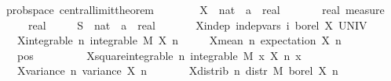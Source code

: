 \documentclass{article}
\begin{document}
\begin{isabellebody}
\isamarkupfalse%
\ {\isacharparenleft}\ prob{\isacharunderscore}space{\isacharparenright}\ central{\isacharunderscore}limit{\isacharunderscore}theorem{\isacharcolon}\isanewline
\ \ \ \isanewline
\ \ \ \ X\ {\isacharcolon}{\isacharcolon}\ {\isachardoublequoteopen}nat\ {\isasymRightarrow}\ {\isacharprime}a\ {\isasymRightarrow}\ real{\isachardoublequoteclose}\ \isanewline
\ \ \ \ {\isasymmu}\ {\isacharcolon}{\isacharcolon}\ {\isachardoublequoteopen}real\ measure{\isachardoublequoteclose}\ \isanewline
\ \ \ \ {\isasymsigma}\ {\isacharcolon}{\isacharcolon}\ real\ \isanewline
\ \ \ \ S\ {\isacharcolon}{\isacharcolon}\ {\isachardoublequoteopen}nat\ {\isasymRightarrow}\ {\isacharprime}a\ {\isasymRightarrow}\ real{\isachardoublequoteclose}\isanewline
\ \ \isanewline
\ \ \ \ X{\isacharunderscore}indep{\isacharcolon}\ {\isachardoublequoteopen}indep{\isacharunderscore}vars\ {\isacharparenleft}{\isasymlambda}i{\isachardot}\ borel{\isacharparenright}\ X\ UNIV{\isachardoublequoteclose}\ \isanewline
\ \ \ \ X{\isacharunderscore}integrable{\isacharcolon}\ {\isachardoublequoteopen}{\isasymAnd}n{\isachardot}\ integrable\ M\ {\isacharparenleft}X\ n{\isacharparenright}{\isachardoublequoteclose}\ \isanewline
\ \ \ \ X{\isacharunderscore}mean{\isacharunderscore}{}{\isacharcolon}\ {\isachardoublequoteopen}{\isasymAnd}n{\isachardot}\ expectation\ {\isacharparenleft}X\ n{\isacharparenright}\ {\isacharequal}\ {}{\isachardoublequoteclose}\ \isanewline
\ \ \ \ {\isasymsigma}{\isacharunderscore}pos{\isacharcolon}\ {\isachardoublequoteopen}{\isasymsigma}\ {\isachargreater}\ {}{\isachardoublequoteclose}\ \ \isanewline
\ \ \ \ X{\isacharunderscore}square{\isacharunderscore}integrable{\isacharcolon}\ {\isachardoublequoteopen}{\isasymAnd}n{\isachardot}\ integrable\ M\ {\isacharparenleft}{\isasymlambda}x{\isachardot}\ {\isacharparenleft}X\ n\ x{\isacharparenright}\ \isanewline
\ \ \ \ X{\isacharunderscore}variance{\isacharcolon}\ {\isachardoublequoteopen}{\isasymAnd}n{\isachardot}\ variance\ {\isacharparenleft}X\ n{\isacharparenright}\ {\isacharequal}\ {\isasymsigma}\ \isanewline
\ \ \ \ X{\isacharunderscore}distrib{\isacharcolon}\ {\isachardoublequoteopen}{\isasymAnd}n{\isachardot}\ distr\ M\ borel\ {\isacharparenleft}X\ n{\isacharparenright}\ {\isacharequal}\ {\isasymmu}{\isachardoublequoteclose}\isanewline

\end{isabellebody}
\end{document}
